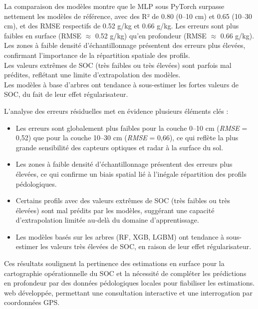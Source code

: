 \documentclass[12pt,a4paper,oneside]{report}
\begin{document}
La comparaison des modèles montre que le MLP sous PyTorch surpasse nettement les modèles de référence, avec des R² de 0.80 (0–10 cm) et 0.65 (10–30 cm), et des RMSE respectifs de 0.52 g/kg et 0.66 g/kg.
Les erreurs sont plus faibles en surface (RMSE $\approx$ 0.52 g/kg) qu’en profondeur (RMSE $\approx$ 0.66 g/kg).
\\
Les zones à faible densité d’échantillonnage présentent des erreurs plus élevées, confirmant l’importance de la répartition spatiale des profils.
\\
Les valeurs extrêmes de SOC (très faibles ou très élevées) sont parfois mal prédites, reflétant une limite d’extrapolation des modèles.\\
Les modèles à base d’arbres ont tendance à sous-estimer les fortes valeurs de SOC, du fait de leur effet régularisateur.

\bigskip

L’analyse des erreurs résiduelles met en évidence plusieurs éléments clés :

\begin{itemize}
    \item Les erreurs sont globalement plus faibles pour la couche 0--10 cm (\textit{RMSE} = 0{,}52) que pour la couche 10--30 cm (\textit{RMSE} = 0{,}66), ce qui reflète la plus grande sensibilité des capteurs optiques et radar à la surface du sol.
    
    \item Les zones à faible densité d’échantillonnage présentent des erreurs plus élevées, ce qui confirme un biais spatial lié à l’inégale répartition des profils pédologiques.

    \item Certains profils avec des valeurs extrêmes de SOC (très faibles ou très élevées) sont mal prédits par les modèles, suggérant une capacité d’extrapolation limitée au-delà du domaine d’apprentissage.

    \item Les modèles basés sur les arbres (RF, XGB, LGBM) ont tendance à sous-estimer les valeurs très élevées de SOC, en raison de leur effet régularisateur.

\end{itemize}


Ces résultats soulignent la pertinence des estimations en surface pour la cartographie opérationnelle du SOC et la nécessité de compléter les prédictions en profondeur par des données pédologiques locales pour fiabiliser les estimations.
web développée, permettant une consultation interactive et une interrogation par coordonnées GPS.
\end{document}
